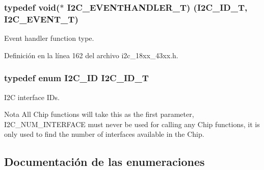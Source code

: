 \subsubsection[{\texorpdfstring{I2\+C\+\_\+\+E\+V\+E\+N\+T\+H\+A\+N\+D\+L\+E\+R\+\_\+T}{I2C_EVENTHANDLER_T}}]{\setlength{\rightskip}{0pt plus 5cm}typedef void($\ast$ I2\+C\+\_\+\+E\+V\+E\+N\+T\+H\+A\+N\+D\+L\+E\+R\+\_\+T) ({\bf I2\+C\+\_\+\+I\+D\+\_\+T}, {\bf I2\+C\+\_\+\+E\+V\+E\+N\+T\+\_\+T})}\hypertarget{group___i2_c__18_x_x__43_x_x_gaef152f4dc1487d90573810007489082e}{}\label{group___i2_c__18_x_x__43_x_x_gaef152f4dc1487d90573810007489082e}


Event handler function type. 



Definición en la línea 162 del archivo i2c\+\_\+18xx\+\_\+43xx.\+h.

\subsubsection[{\texorpdfstring{I2\+C\+\_\+\+I\+D\+\_\+T}{I2C_ID_T}}]{\setlength{\rightskip}{0pt plus 5cm}typedef enum {\bf I2\+C\+\_\+\+ID}  {\bf I2\+C\+\_\+\+I\+D\+\_\+T}}\hypertarget{group___i2_c__18_x_x__43_x_x_ga957556a4d900506cd4cba8427afd81e6}{}\label{group___i2_c__18_x_x__43_x_x_ga957556a4d900506cd4cba8427afd81e6}


I2C interface I\+Ds. 

\begin{DoxyNote}{Nota}
All Chip functions will take this as the first parameter, I2\+C\+\_\+\+N\+U\+M\+\_\+\+I\+N\+T\+E\+R\+F\+A\+CE must never be used for calling any Chip functions, it is only used to find the number of interfaces available in the Chip. 
\end{DoxyNote}


\subsection{Documentación de las enumeraciones}
